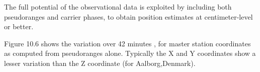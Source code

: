 The full potential of the observational data is exploited by including both pseudoranges
and carrier phases, to obtain position estimates at centimeter-level or better.

Figure 10.6 shows the variation over 42 minutes , for master station coordinates as computed from pseudoranges alone. Typically the X and Y coordinates show a lesser variation than the Z coordinate (for Aalborg,Denmark).